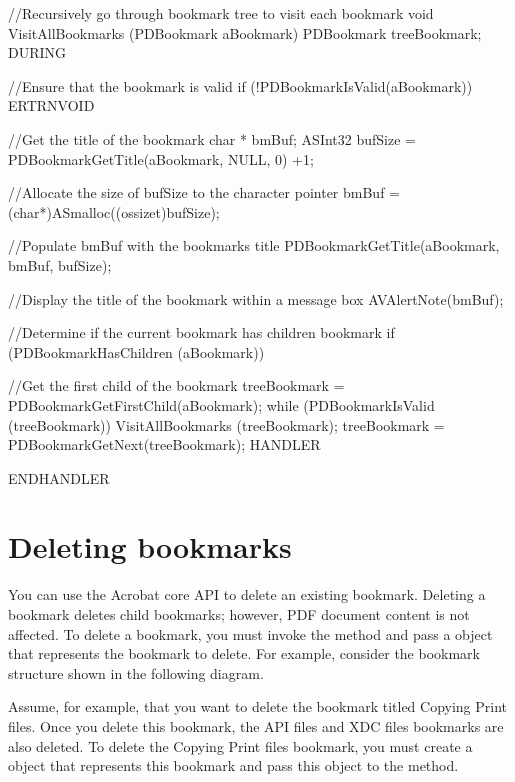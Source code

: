 \documentclass[letterpaper,12pt,english,openany,oneside]{sphinxmanual}
\begin{document}
\begin{sphinxVerbatim}[commandchars=\\\{\}]
//Recursively go through bookmark tree to visit each bookmark
void VisitAllBookmarks (PDBookmark aBookmark)
\PYGZob{}
  PDBookmark treeBookmark;
  DURING

//Ensure that the bookmark is valid
 if (!PDBookmarkIsValid(aBookmark))
      E\PYGZus{}RTRN\PYGZus{}VOID

//Get the title of the bookmark
 char * bmBuf;
  ASInt32 bufSize = PDBookmarkGetTitle(aBookmark, NULL, 0) +1;

//Allocate the size of bufSize to the character pointer
 bmBuf = (char*)ASmalloc((os\PYGZus{}size\PYGZus{}t)bufSize);

//Populate bmBuf with the bookmark\PYGZsq{}s title
 PDBookmarkGetTitle(aBookmark, bmBuf, bufSize);


//Display the title of the bookmark within a message box
 AVAlertNote(bmBuf);

//Determine if the current bookmark has children bookmark
 if (PDBookmarkHasChildren (aBookmark))
  \PYGZob{}

//Get the first child of the bookmark
     treeBookmark = PDBookmarkGetFirstChild(aBookmark);
      while (PDBookmarkIsValid (treeBookmark))    \PYGZob{}
      VisitAllBookmarks (treeBookmark);
      treeBookmark = PDBookmarkGetNext(treeBookmark);
      \PYGZcb{}
  \PYGZcb{}
  HANDLER

  END\PYGZus{}HANDLER
\PYGZcb{}
\end{sphinxVerbatim}


\section{Deleting bookmarks}
\label{\detokenize{Plugins_Bookmark:deleting-bookmarks}}
You can use the Acrobat core API to delete an existing bookmark. Deleting a bookmark deletes child bookmarks; however, PDF document content is not affected. To delete a bookmark, you must invoke the  method and pass a  object that represents the bookmark to delete. For example, consider the bookmark structure shown in the following diagram.

\noindent{}

Assume, for example, that you want to delete the bookmark titled Copying Print files. Once you delete this bookmark, the API files and XDC files bookmarks are also deleted. To delete the Copying Print files bookmark, you must create a  object that represents this bookmark and pass this object to the  method.
\end{document}
